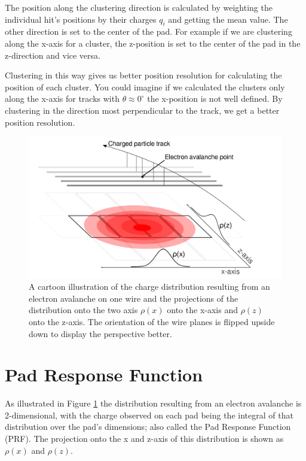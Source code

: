 \documentclass[review]{elsarticle}
\begin{document}
 The position along the clustering direction is calculated by weighting the individual hit's positions by their charges $q_i$ and getting the mean value. The other direction is set to the center of the pad. For example if we are clustering along the x-axis for a cluster, the z-position is set to the center of the pad in the z-direction and vice versa. 

Clustering in this way gives us better position resolution for calculating the position of each cluster. You could imagine if we calculated the clusters only along the x-axis for tracks with $\theta \approx 0^{\circ}$ the x-position is not well defined. By clustering in the direction most perpendicular to the track, we get a better position resolution.



\begin{figure}[H]
\includegraphics[width=\linewidth]{padsat_Large}
\caption{A cartoon illustration of the charge distribution resulting from an electron avalanche on one wire and the projections of the distribution onto the two axis $\rho(x)$ onto the x-axis and $\rho(z)$ onto the z-axis. The orientation of the wire planes is flipped upside down to display the perspective better.}
\label{fig:prf}
\end{figure}

\section{Pad Response Function}
As illustrated in Figure \ref{fig:prf} the distribution resulting from an electron avalanche is 2-dimensional, with the charge observed on each pad being the integral of that distribution over the pad's dimensions; also called the Pad Response Function (PRF). The projection onto the x and z-axis of this distribution is shown as $\rho(x)$ and $\rho(z)$. 
\end{document}
